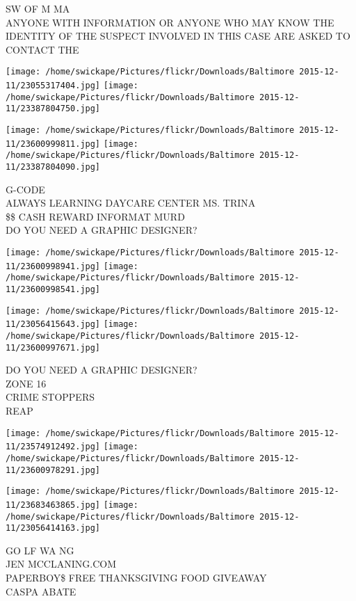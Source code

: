 \documentclass[10pt,letterpaper]{article}
\begin{document}
SW OF M MA\\
ANYONE WITH INFORMATION OR ANYONE WHO MAY KNOW THE IDENTITY OF THE SUSPECT INVOLVED IN THIS CASE ARE ASKED TO CONTACT THE
\pagebreak

\texttt{[image: /home/swickape/Pictures/flickr/Downloads/Baltimore 2015-12-11/23055317404.jpg]}
\texttt{[image: /home/swickape/Pictures/flickr/Downloads/Baltimore 2015-12-11/23387804750.jpg]}

\texttt{[image: /home/swickape/Pictures/flickr/Downloads/Baltimore 2015-12-11/23600999811.jpg]}
\texttt{[image: /home/swickape/Pictures/flickr/Downloads/Baltimore 2015-12-11/23387804090.jpg]}

G{-}CODE\\
ALWAYS LEARNING DAYCARE CENTER MS. TRINA\\
\$\$ CASH REWARD INFORMAT MURD\\
DO YOU NEED A GRAPHIC DESIGNER?
\pagebreak

\texttt{[image: /home/swickape/Pictures/flickr/Downloads/Baltimore 2015-12-11/23600998941.jpg]}
\texttt{[image: /home/swickape/Pictures/flickr/Downloads/Baltimore 2015-12-11/23600998541.jpg]}

\texttt{[image: /home/swickape/Pictures/flickr/Downloads/Baltimore 2015-12-11/23056415643.jpg]}
\texttt{[image: /home/swickape/Pictures/flickr/Downloads/Baltimore 2015-12-11/23600997671.jpg]}

DO YOU NEED A GRAPHIC DESIGNER?\\
ZONE 16\\
CRIME STOPPERS\\
REAP
\pagebreak

\texttt{[image: /home/swickape/Pictures/flickr/Downloads/Baltimore 2015-12-11/23574912492.jpg]}
\texttt{[image: /home/swickape/Pictures/flickr/Downloads/Baltimore 2015-12-11/23600978291.jpg]}

\texttt{[image: /home/swickape/Pictures/flickr/Downloads/Baltimore 2015-12-11/23683463865.jpg]}
\texttt{[image: /home/swickape/Pictures/flickr/Downloads/Baltimore 2015-12-11/23056414163.jpg]}

GO LF WA NG\\
JEN MCCLANING.COM\\
PAPERBOY\$ FREE THANKSGIVING FOOD GIVEAWAY\\
CASPA ABATE
\pagebreak
\end{document}
